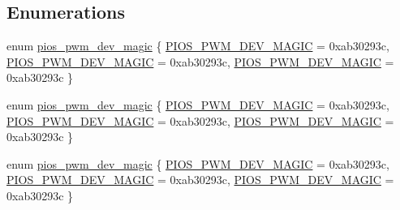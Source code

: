 \subsection*{Enumerations}
\begin{DoxyCompactItemize}
\item 
enum \hyperlink{group___p_i_o_s___p_w_m_ga42d376e6bd816a93a35efb03226d676e}{pios\-\_\-pwm\-\_\-dev\-\_\-magic} \{ \hyperlink{group___p_i_o_s___p_w_m_gga42d376e6bd816a93a35efb03226d676ea80a6eff8dafc5fcd440b4cb8282fc26e}{P\-I\-O\-S\-\_\-\-P\-W\-M\-\_\-\-D\-E\-V\-\_\-\-M\-A\-G\-I\-C} = 0xab30293c, 
\hyperlink{group___p_i_o_s___p_w_m_gga42d376e6bd816a93a35efb03226d676ea80a6eff8dafc5fcd440b4cb8282fc26e}{P\-I\-O\-S\-\_\-\-P\-W\-M\-\_\-\-D\-E\-V\-\_\-\-M\-A\-G\-I\-C} = 0xab30293c, 
\hyperlink{group___p_i_o_s___p_w_m_gga42d376e6bd816a93a35efb03226d676ea80a6eff8dafc5fcd440b4cb8282fc26e}{P\-I\-O\-S\-\_\-\-P\-W\-M\-\_\-\-D\-E\-V\-\_\-\-M\-A\-G\-I\-C} = 0xab30293c
 \}
\item 
enum \hyperlink{group___p_i_o_s___p_w_m_ga42d376e6bd816a93a35efb03226d676e}{pios\-\_\-pwm\-\_\-dev\-\_\-magic} \{ \hyperlink{group___p_i_o_s___p_w_m_gga42d376e6bd816a93a35efb03226d676ea80a6eff8dafc5fcd440b4cb8282fc26e}{P\-I\-O\-S\-\_\-\-P\-W\-M\-\_\-\-D\-E\-V\-\_\-\-M\-A\-G\-I\-C} = 0xab30293c, 
\hyperlink{group___p_i_o_s___p_w_m_gga42d376e6bd816a93a35efb03226d676ea80a6eff8dafc5fcd440b4cb8282fc26e}{P\-I\-O\-S\-\_\-\-P\-W\-M\-\_\-\-D\-E\-V\-\_\-\-M\-A\-G\-I\-C} = 0xab30293c, 
\hyperlink{group___p_i_o_s___p_w_m_gga42d376e6bd816a93a35efb03226d676ea80a6eff8dafc5fcd440b4cb8282fc26e}{P\-I\-O\-S\-\_\-\-P\-W\-M\-\_\-\-D\-E\-V\-\_\-\-M\-A\-G\-I\-C} = 0xab30293c
 \}
\item 
enum \hyperlink{group___p_i_o_s___p_w_m_ga42d376e6bd816a93a35efb03226d676e}{pios\-\_\-pwm\-\_\-dev\-\_\-magic} \{ \hyperlink{group___p_i_o_s___p_w_m_gga42d376e6bd816a93a35efb03226d676ea80a6eff8dafc5fcd440b4cb8282fc26e}{P\-I\-O\-S\-\_\-\-P\-W\-M\-\_\-\-D\-E\-V\-\_\-\-M\-A\-G\-I\-C} = 0xab30293c, 
\hyperlink{group___p_i_o_s___p_w_m_gga42d376e6bd816a93a35efb03226d676ea80a6eff8dafc5fcd440b4cb8282fc26e}{P\-I\-O\-S\-\_\-\-P\-W\-M\-\_\-\-D\-E\-V\-\_\-\-M\-A\-G\-I\-C} = 0xab30293c, 
\hyperlink{group___p_i_o_s___p_w_m_gga42d376e6bd816a93a35efb03226d676ea80a6eff8dafc5fcd440b4cb8282fc26e}{P\-I\-O\-S\-\_\-\-P\-W\-M\-\_\-\-D\-E\-V\-\_\-\-M\-A\-G\-I\-C} = 0xab30293c
 \}
\end{DoxyCompactItemize}

